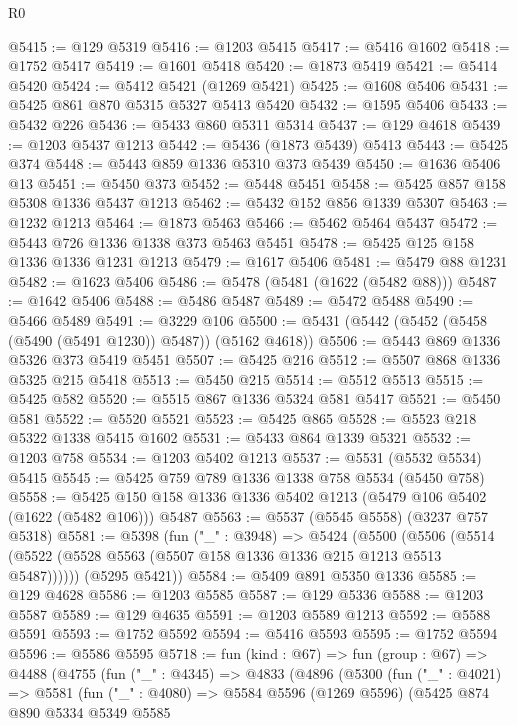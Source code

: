 \begin{lexlean}{R0}
\begin{coremodule}
@5415 := @129 @5319
@5416 := @1203 @5415
@5417 := @5416 @1602
@5418 := @1752 @5417
@5419 := @1601 @5418
@5420 := @1873 @5419
@5421 := @5414 @5420
@5424 := @5412 @5421 (@1269 @5421)
@5425 := @1608 @5406
@5431 := @5425 @861 @870 @5315 @5327 @5413 @5420
@5432 := @1595 @5406
@5433 := @5432 @226
@5436 := @5433 @860 @5311 @5314
@5437 := @129 @4618
@5439 := @1203 @5437 @1213
@5442 := @5436 (@1873 @5439) @5413
@5443 := @5425 @374
@5448 := @5443 @859 @1336 @5310 @373 @5439
@5450 := @1636 @5406 @13
@5451 := @5450 @373
@5452 := @5448 @5451
@5458 := @5425 @857 @158 @5308 @1336 @5437 @1213
@5462 := @5432 @152 @856 @1339 @5307
@5463 := @1232 @1213
@5464 := @1873 @5463
@5466 := @5462 @5464 @5437
@5472 := @5443 @726 @1336 @1338 @373 @5463 @5451
@5478 := @5425 @125 @158 @1336 @1336 @1231 @1213
@5479 := @1617 @5406
@5481 := @5479 @88 @1231
@5482 := @1623 @5406
@5486 := @5478 (@5481 (@1622 (@5482 @88)))
@5487 := @1642 @5406
@5488 := @5486 @5487
@5489 := @5472 @5488
@5490 := @5466 @5489
@5491 := @3229 @106
@5500 := @5431 (@5442 (@5452 (@5458 (@5490 (@5491 @1230)) @5487)) (@5162 @4618))
@5506 := @5443 @869 @1336 @5326 @373 @5419 @5451
@5507 := @5425 @216
@5512 := @5507 @868 @1336 @5325 @215 @5418
@5513 := @5450 @215
@5514 := @5512 @5513
@5515 := @5425 @582
@5520 := @5515 @867 @1336 @5324 @581 @5417
@5521 := @5450 @581
@5522 := @5520 @5521
@5523 := @5425 @865
@5528 := @5523 @218 @5322 @1338 @5415 @1602
@5531 := @5433 @864 @1339 @5321
@5532 := @1203 @758
@5534 := @1203 @5402 @1213
@5537 := @5531 (@5532 @5534) @5415
@5545 := @5425 @759 @789 @1336 @1338 @758 @5534 (@5450 @758)
@5558 := @5425 @150 @158 @1336 @1336 @5402 @1213 (@5479 @106 @5402 (@1622 (@5482 @106))) @5487
@5563 := @5537 (@5545 @5558) (@3237 @757 @5318)
@5581 := @5398
    (fun ("_" : @3948) =>
    @5424
      (@5500 (@5506 (@5514 (@5522 (@5528 @5563 (@5507 @158 @1336 @1336 @215 @1213 @5513 @5487))))))
      (@5295 @5421))
@5584 := @5409 @891 @5350 @1336
@5585 := @129 @4628
@5586 := @1203 @5585
@5587 := @129 @5336
@5588 := @1203 @5587
@5589 := @129 @4635
@5591 := @1203 @5589 @1213
@5592 := @5588 @5591
@5593 := @1752 @5592
@5594 := @5416 @5593
@5595 := @1752 @5594
@5596 := @5586 @5595
@5718 := fun (kind : @67) =>
  fun (group : @67) =>
  @4488
    (@4755
      (fun ("_" : @4345) =>
      @4833
        (@4896
          (@5300
            (fun ("_" : @4021) =>
            @5581
              (fun ("_" : @4080) =>
              @5584
                @5596
                (@1269 @5596)
                (@5425
                  @874
                  @890
                  @5334
                  @5349
                  @5585

\end{coremodule}
\end{lexlean}

